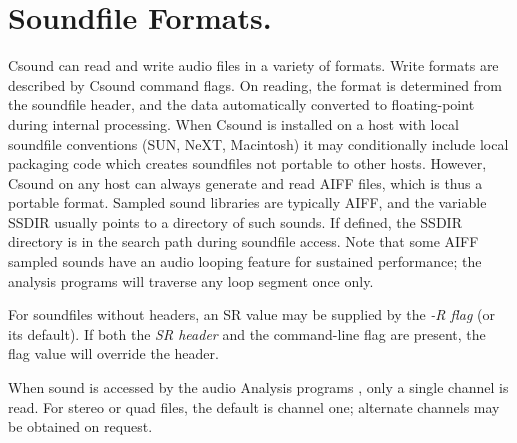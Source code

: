 \begin{comment}
\documentclass[10pt]{article}
\usepackage{fullpage, graphicx, url}
\setlength{\parskip}{1ex}
\setlength{\parindent}{0ex}
\title{Soundfile Formats.}



\begin{tabular}{ccc}
The Alternative Csound Reference Manual & & \\
Previous &The Utility Programs &Next

\end{tabular}

\end{comment}
\section{Soundfile Formats.}


  Csound can read and write audio files in a variety of formats. Write formats are described by Csound command flags. On reading, the format is determined from the soundfile header, and the data automatically converted to floating-point during internal processing. When Csound is installed on a host with local soundfile conventions (SUN, NeXT, Macintosh) it may conditionally include local packaging code which creates soundfiles not portable to other hosts. However, Csound on any host can always generate and read AIFF files, which is thus a portable format. Sampled sound libraries are typically AIFF, and the variable SSDIR usually points to a directory of such sounds. If defined, the SSDIR directory is in the search path during soundfile access. Note that some AIFF sampled sounds have an audio looping feature for sustained performance; the analysis programs will traverse any loop segment once only. 


  For soundfiles without headers, an SR value may be supplied by the \emph{-R flag}
 (or its default). If both the \emph{SR header}
 and the command-line flag are present, the flag value will override the header. 


  When sound is accessed by the audio Analysis programs , only a single channel is read. For stereo or quad files, the default is channel one; alternate channels may be obtained on request. 


\begin{comment}
\begin{tabular}{lcr}
Previous &Home &Next \\
The Utility Programs &Up &Credits

\end{tabular}



\end{comment}
